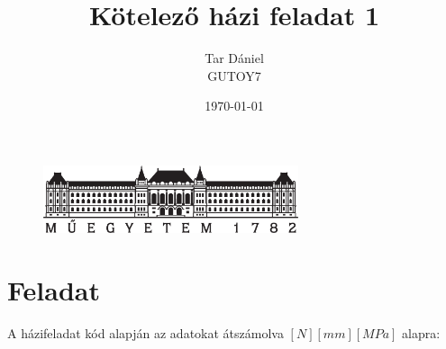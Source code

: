 \documentclass{article}
\begin{document}
	
	\begin{titlepage}
		\setlength{\headheight}{20pt}
		\title{\huge Kötelező házi feladat 1
		}
		\author{Tar Dániel\\GUTOY7}
		\date{\today}
		\maketitle
		\thispagestyle{fancy}
		
		\begin{figure}
			\begin{center}
				\includegraphics[height=2cm]{logo_bme_kicsi.eps}
			\end{center}
		\end{figure}
		
	\end{titlepage}
	\newpage

	 
	\newpage
	
	
	\setlength{\headheight}{0pt}
	\tableofcontents
	\newpage
	
	\setcounter{page}{1}

	
	
	

	
	
	\section{Feladat}
	
	A házifeladat kód alapján az adatokat átszámolva $[N][mm][MPa]$ alapra:
	
\end{document}
